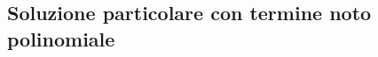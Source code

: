 \subsection{Soluzione particolare con termine noto polinomiale}
\label{sec:esercizi-equazioni-differenziali-termine-noto-polinomiale}
